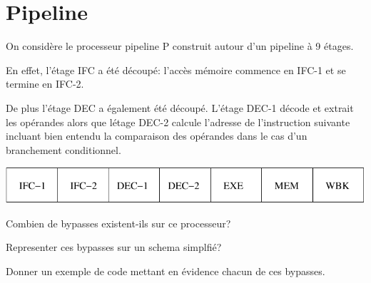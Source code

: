 %
%

\section{Pipeline}

On consid\`ere le processeur pipeline P construit autour d'un pipeline
\`a 9 \'etages.

En effet, l'\'etage IFC a \'et\'e d\'ecoup\'e: l'acc\`es m\'emoire commence
en IFC-1 et se termine en IFC-2.

De plus l'\'etage DEC a \'egalement \'et\'e d\'ecoup\'e. L'\'etage
DEC-1 d\'ecode et extrait les op\'erandes alors que l\'etage DEC-2 calcule
l'adresse de l'instruction suivante incluant bien entendu la comparaison
des op\'erandes dans le cas d'un branchement conditionnel.

\begin{center}
  \includegraphics[scale=0.8]{figures/pipeline.pdf}
\end{center}

Combien de bypasses existent-ils sur ce processeur?

Representer ces bypasses sur un schema simplfi\'e?

Donner un exemple de code mettant en \'evidence chacun de ces bypasses.


